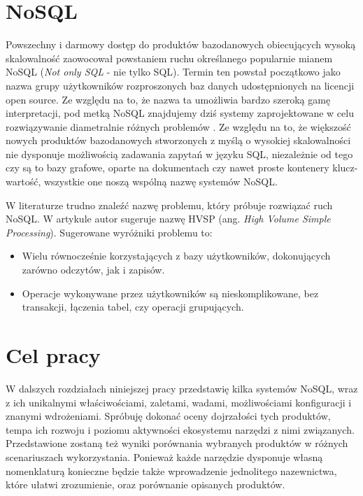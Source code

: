 \section{NoSQL}
Powszechny i darmowy dostęp do produktów bazodanowych obiecujących wysoką skalowalność zaowocował powstaniem ruchu określanego popularnie mianem NoSQL (\emph{Not only SQL} - nie tylko SQL).
Termin ten powstał początkowo jako nazwa grupy użytkowników rozproszonych baz danych udostępnionych na licencji open source.
Ze względu na to, że nazwa ta umożliwia bardzo szeroką gamę interpretacji, pod metką NoSQL znajdujemy dziś systemy zaprojektowane w celu rozwiązywanie diametralnie różnych problemów \cite{evans-nosql-what-is-in-a-name}. 
Ze względu na to, że większość nowych produktów bazodanowych stworzonych z myślą o wysokiej skalowalności nie dysponuje możliwością zadawania zapytań w języku SQL, niezależnie od tego czy są to bazy grafowe, oparte na dokumentach czy nawet proste kontenery klucz-wartość, wszystkie one noszą wspólną nazwę systemów NoSQL.

W literaturze trudno znaleźć nazwę problemu, który próbuje rozwiązać ruch NoSQL. 
W artykule \cite{monash-db-hvsp} autor sugeruje nazwę HVSP (ang. \emph{High Volume Simple Processing}). 
Sugerowane wyróżniki problemu to:
\begin{itemize}
 \item Wielu równocześnie korzystających z bazy użytkowników, dokonujących zarówno odczytów, jak i zapisów.
 \item Operacje wykonywane przez użytkowników są nieskomplikowane, bez transakcji, łączenia tabel, czy operacji grupujących.
\end{itemize}

\section{Cel pracy}

W dalszych rozdziałach niniejszej pracy przedstawię kilka systemów NoSQL, wraz z ich unikalnymi właściwościami, zaletami, wadami, możliwościami konfiguracji i znanymi wdrożeniami.
Spróbuję dokonać oceny dojrzałości tych produktów, tempa ich rozwoju i poziomu aktywności ekosystemu narzędzi z nimi związanych.
Przedstawione zostaną też wyniki porównania wybranych produktów w różnych scenariuszach wykorzystania.
Ponieważ każde narzędzie dysponuje własną nomenklaturą konieczne będzie także wprowadzenie jednolitego nazewnictwa, które ułatwi zrozumienie, oraz porównanie opisanych produktów.

